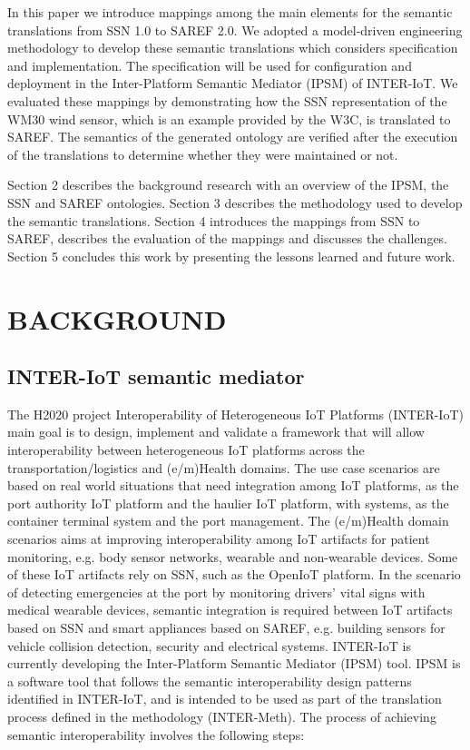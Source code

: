 \documentclass{sig-alternate-05-2015}
\begin{document}
In this paper we introduce mappings among the main elements for the semantic translations from SSN 1.0 to SAREF 2.0. We adopted a model-driven engineering methodology to develop these semantic translations which considers specification and implementation. The specification will be used for configuration and deployment in the Inter-Platform Semantic Mediator (IPSM) of INTER-IoT. We evaluated these mappings by demonstrating how the SSN representation of the WM30 wind sensor, which is an example provided by the W3C, is translated to SAREF. The semantics of the generated ontology are verified after the execution of the translations to determine whether they were maintained or not. 

Section 2 describes the background research with an overview of the IPSM, the SSN and SAREF ontologies. Section 3 describes the methodology used to develop the semantic translations. Section 4 introduces the mappings from SSN to SAREF, describes the evaluation of the mappings and discusses the challenges. Section 5 concludes this work by presenting the lessons learned and future work. 


\section{BACKGROUND}

\subsection{INTER-IoT semantic mediator}
The H2020 project Interoperability of Heterogeneous IoT Platforms (INTER-IoT) \cite{Ganzha2017a,Ganzha2016} main goal is to design, implement and validate a framework that will allow interoperability between heterogeneous IoT platforms across the transportation/logistics and (e/m)Health domains. The use case scenarios are based on real world situations that need integration among IoT platforms, as the port authority IoT platform and the haulier IoT platform, with systems, as the container terminal system and the port management. The (e/m)Health domain scenarios aims at improving interoperability among IoT artifacts for patient monitoring, e.g. body sensor networks, wearable and non-wearable devices. Some of these IoT artifacts rely on SSN, such as the OpenIoT platform. In the scenario of detecting emergencies at the port by monitoring drivers' vital signs with medical wearable devices, semantic integration is required between IoT artifacts based on SSN and smart appliances based on SAREF, e.g. building sensors for vehicle collision detection, security and electrical systems. INTER-IoT is currently developing the  Inter-Platform Semantic Mediator (IPSM) tool. IPSM is a software tool that follows the semantic interoperability design patterns identified in INTER-IoT, and is intended to be used as part of the translation process defined in the methodology (INTER-Meth). The process of achieving semantic interoperability involves the following steps:
\end{document}

